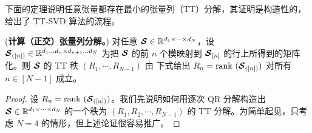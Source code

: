 下面的定理说明任意张量都存在最小的张量列（TT）分解，其证明是构造性的，给出了 TT-SVD 算法的流程。
\begin{theorem}(\textbf{计算（正交）张量列分解。})\label{thm:tt-decomposition}
对任意 $\bm{\mathcal{S}}\in\mathbb{R}^{d_1\times\dots\times d_N}$，设 $\bm{\mathcal{S}}_{([n])}\in\mathbb{R}^{d_1\dots d_n\times d_{n+1}\dots d_N}$ 为把 $\bm{\mathcal{S}}$ 的前 $n$  个模映射到 $\bm{\mathcal{S}}_{[n]}$ 的行上所得到的矩阵化。则 $\bm{\mathcal{S}}$ 的 TT 秩 $(R_1,\cdots,R_{N-1})$ 由
    下式给出
    $R_n = \mathrm{rank}~(\bm{\mathcal{S}}_{([n])})$ 对所有 $n\in[N-1]$ 成立。
\end{theorem}
\begin{proof}
    设 $R_n = \mathrm{rank}~(\bm{\mathcal{S}}_{([n])})$。我们先说明如何用逐次 QR 分解构造出 $\bm{\mathcal{S}}\in\mathbb{R}^{d_1\times\cdots\times d_N}$ 的一个秩为 $(R_1,R_2,\cdots,R_{N-1})$ 的 TT 分解。为简单起见，只考虑 $N=4$ 的情形，但上述论证很容易推广。


\end{proof}
